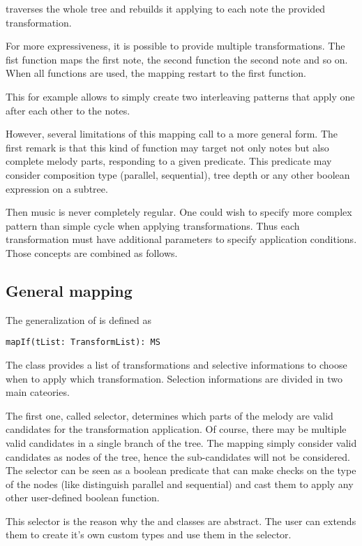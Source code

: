 \documentclass[twocolumn, 11pt]{article}
\begin{document}
 traverses the whole tree and rebuilds it applying to each note the provided transformation.

For more expressiveness, it is possible to provide multiple transformations. The fist function maps the first note, the second function the second note and so on. When all functions are used, the mapping restart to the first function.

This for example allows to simply create two interleaving patterns that apply one after each other to the notes.

However, several limitations of this mapping call to a more general form.
The first remark is that this kind of function may target not only notes but also complete melody parts, responding to a given predicate. This predicate may consider composition type (parallel, sequential), tree depth or any other boolean expression on a subtree.

Then music is never completely regular. One could wish to specify more complex pattern than simple cycle when applying transformations. Thus each transformation must have additional parameters to specify application conditions. Those concepts are combined as follows.

\subsection{General mapping}

The generalization of  is defined as
\begin{lstlisting}
mapIf(tList: TransformList): MS
\end{lstlisting}
The class  provides a list of transformations and selective informations to choose when to apply which transformation.
Selection informations are divided in two main cateories.

The first one, called selector, determines which parts of the melody are valid candidates for the transformation application.
Of course, there may be multiple valid candidates in a single branch of the tree.
The mapping simply consider valid candidates as nodes of the tree, hence the sub-candidates will not be considered.
The selector can be seen as a boolean predicate that can make checks on the type of the nodes (like distinguish parallel and sequential) and cast them to apply any other user-defined boolean function.

This selector is the reason why the  and  classes are abstract. The user can extends them to create it's own custom types and use them in the selector.
\end{document}
